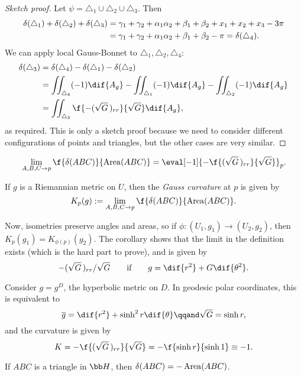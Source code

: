 \begin{proof}[Sketch proof]
	Let $\psi=\triangle_1 \cup \triangle_2 \cup \triangle_3$. Then
	\begin{align*}
		\operatorname{\delta}(\triangle_1) + \operatorname{\delta}(\triangle_2) + \operatorname{\delta}(\triangle_3)
		&= \gamma_1 + \gamma_2 + \alpha_1 \alpha_2 + \beta_1 + \beta_2 + x_1 + x_2 + x_3 - 3\pi \\
		&= \gamma_1 + \gamma_2 + \alpha_1 \alpha_2 + \beta_1 + \beta_2 - \pi
		 = \operatorname{\delta}(\triangle_4).
	\end{align*}
	We can apply local Gauss-Bonnet to $\triangle_1, \triangle_2, \triangle_4$:
	\begin{align*}
		\defect(\triangle_3)
		&= \defect(\triangle_4)-\defect(\triangle_1)-\defect(\triangle_2) \\
		&= \iint_{\triangle_4} (-1)\dif{A_g} - \iint_{\triangle_1} (-1) \dif{A_g} - \iint_{\triangle_2} (-1)\dif{A_g} \\
		&= \iint_{\triangle_3} \f{-(\sqrt{G}\,)_{rr}}{\sqrt{G}} \dif{A_g},
	\end{align*}
	as required. This is only a sketch proof because we need to consider different configurations of points and triangles, but the other cases are very similar.
\end{proof}

\begin{corollary}
	\begin{equation*}
		\lim_{A,B,C\to p} \f{\defect(ABC)}{\Area(ABC)} = \eval[-1]{-\f{(\sqrt{G}\,)_{rr}}{\sqrt{G}}}_p.
	\end{equation*}
\end{corollary}

\begin{definition}
	If $g$ is a Riemannian metric on $U$, then the \emph{Gauss curvature} at $p$ is given by
	\begin{equation*}
		K_p(g) := \lim_{A,B,C\to p} \f{\defect(ABC)}{\Area(ABC)}.
	\end{equation*}
\end{definition}

Now, isometries preserve angles and areas, so if $\phi:(U_1,g_1) \to (U_2,g_2)$, then $K_p(g_1) = K_{\phi(p)}(g_2)$. The corollary shows that the limit in the definition exists (which is the hard part to prove), and is given by
\begin{equation*}
	-(\sqrt{G}\,)_{rr}/\sqrt{G} \qquad \text{if} \qquad g=\dif{r^2} + G\dif{\theta^2}.
\end{equation*}

\begin{example}
	Consider $g=g^D$, the hyperbolic metric on $D$.  In geodesic polar coordinates, this is equivalent to
	\begin{equation*}
		\overline{g} = \dif{r^2} + \sinh^2 r \dif{\theta} \qqand
		\sqrt{G} = \sinh r,
	\end{equation*}
	and the curvature is given by
	\begin{equation*}
		K = -\f{(\sqrt{G}\,)_{rr}}{\sqrt{G}} = -\f{\sinh r}{\sinh 1} \equiv -1.
	\end{equation*}
\end{example}

\begin{corollary}
	If $ABC$ is a triangle in $\HH$, then $\operatorname{\delta}(ABC) = -\operatorname{Area}(ABC)$.
\end{corollary}

